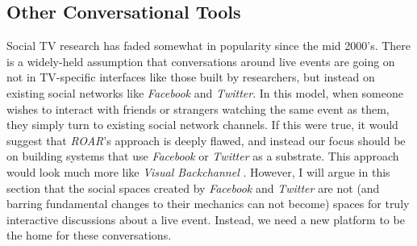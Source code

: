 % 	
% 	
% 
% 
% 
% 
% 
% 
% 
% 








\subsection{Other Conversational Tools}

Social TV research has faded somewhat in popularity since the mid 2000's.  There is a widely-held assumption that conversations around live events are going on not in TV-specific interfaces like those built by researchers, but instead on existing social networks like \emph{Facebook} and \emph{Twitter}. In this model, when someone wishes to interact with friends or strangers watching the same event as them, they simply turn to existing social network channels. If this were true, it would suggest that \emph{ROAR}'s approach is deeply flawed, and instead our focus should be on building systems that use \emph{Facebook} or \emph{Twitter} as a substrate. This approach would look much more like \emph{Visual Backchannel} \citep{Dork:2010fb}. However, I will argue in this section that the social spaces created by \emph{Facebook} and \emph{Twitter} are not (and barring fundamental changes to their mechanics can not become) spaces for truly interactive discussions about a live event. Instead, we need a new platform to be the home for these conversations.


